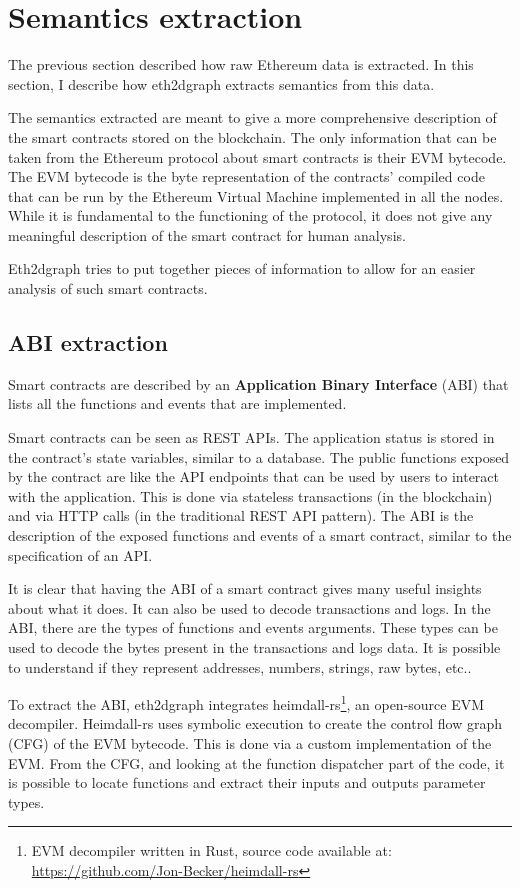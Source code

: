\section{Semantics extraction}

The previous section described how raw Ethereum data is extracted. In this section, I describe how eth2dgraph extracts semantics from this data.

The semantics extracted are meant to give a more comprehensive description of the smart contracts stored on the blockchain. The only information that can be taken from the Ethereum protocol about smart contracts is their EVM bytecode. The EVM bytecode is the byte representation of the contracts' compiled code that can be run by the Ethereum Virtual Machine implemented in all the nodes. While it is fundamental to the functioning of the protocol, it does not give any meaningful description of the smart contract for human analysis. 

Eth2dgraph tries to put together pieces of information to allow for an easier analysis of such smart contracts.

\subsection{ABI extraction}

\label{decompilation-section}
Smart contracts are described by an \textbf{Application Binary Interface} (ABI) that lists all the functions and events that are implemented. 

Smart contracts can be seen as REST APIs. The application status is stored in the contract's state variables, similar to a database.
The public functions exposed by the contract are like the API endpoints that can be used by users to interact with the application. This is done via stateless transactions (in the blockchain) and via HTTP calls (in the traditional REST API pattern). The ABI is the description of the exposed functions and events of a smart contract, similar to the specification of an API. 

It is clear that having the ABI of a smart contract gives many useful insights about what it does. It can also be used to decode transactions and logs. In the ABI, there are the types of functions and events arguments. These types can be used to decode the bytes present in the transactions and logs data. It is possible to understand if they represent addresses, numbers, strings, raw bytes, etc..

To extract the ABI, eth2dgraph integrates heimdall-rs\footnote{EVM decompiler written in Rust, source code available at: \url{https://github.com/Jon-Becker/heimdall-rs}}, an open-source EVM decompiler. Heimdall-rs uses symbolic execution to create the control flow graph (CFG) of the EVM bytecode. This is done via a custom implementation of the EVM. From the CFG, and looking at the function dispatcher part of the code, it is possible to locate functions and extract their inputs and outputs parameter types.

